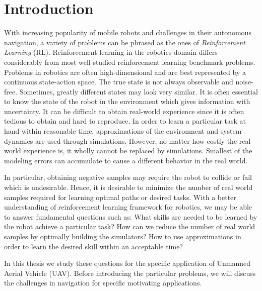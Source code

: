 \documentclass[12pt]{report}
\begin{document}
\tableofcontents
\pagebreak

\listoffigures
\pagebreak



\pagestyle{myheadings}



\chapter{Introduction} %

\label{introduction} %

With increasing popularity of mobile robots and challenges in their autonomous navigation, a variety of problems can be phrased as the ones of \textit{Reinforcement Learning} (RL). Reinforcement learning in the robotics domain differs considerably from most well-studied reinforcement learning benchmark problems. Problems in robotics are often high-dimensional and are best represented by a continuous state-action space. The true state is not always observable and noise-free. Sometimes, greatly different states may look very similar. It is often essential to know the state of the robot in the environment which gives information with uncertainty. It can be difficult to obtain real-world experience since it is often tedious to obtain and hard to reproduce. In order to learn a particular task at hand within reasonable time, approximations of the environment and system dynamics are used through simulations.  However, no matter how costly the real-world experience is, it wholly cannot be replaced by simulations. Smallest of the modeling errors can accumulate to cause a different behavior in the real world.\par 

In particular, obtaining negative samples may require the robot to collide or fail which is undesirable. Hence, it is desirable to minimize the number of real world samples required for learning optimal paths or desired tasks. With a better understanding of reinforcement learning framework for robotics, we may be able to answer fundamental questions such as: What skills are needed to be learned by the robot achieve a particular task? How can we reduce the number of real world samples by optimally building the simulators? How to use approximations in order to learn the desired skill within an acceptable time? \par 
In this thesis we study these questions for the specific application of Unmanned Aerial Vehicle (UAV). Before introducing the particular problems, we will discuss the challenges in navigation for specific motivating applications.
\end{document}
